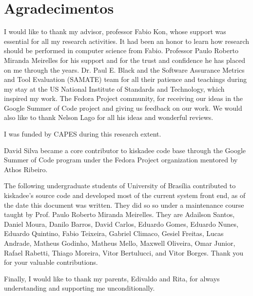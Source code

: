 \chapter*{Agradecimentos}

I would like to thank my advisor, professor Fabio Kon, whose support was
essential for all my research activities. It had been an honor to learn how
research should be performed in computer science from Fabio.  Professor Paulo
Roberto Miranda Meirelles for his support and for the trust and confidence he
has placed on me through the years. Dr. Paul E. Black and the Software
Assurance Metrics and Tool Evaluation (SAMATE) team for all their patience and
teachings during my stay at the US National Institute of Standards and
Technology, which inspired my work. The Fedora Project community, for receiving
our ideas in the Google Summer of Code project and giving us feedback on our
work. We would also like to thank Nelson Lago for all his ideas and wonderful
reviews.

I was funded by CAPES during this research extent.

David Silva became a core contributor to kiskadee code base through the Google
Summer of Code program under the Fedora Project organization mentored by Athos
Ribeiro.

The following undergraduate students of University of Brasília contributed to
kiskadee's source code and developed most of the current system front end, as of
the date this document was written. They did so so under a maintenance course
taught by Prof. Paulo Roberto Miranda Meirelles.
They are Adailson Santos,
Daniel Moura,
Danilo Barros,
David Carlos,
Eduardo Gomes,
Eduardo Nunes,
Eduardo Quintino,
Fabio Teixeira,
Gabriel Climaco,
Gesiel Freitas,
Lucas Andrade,
Matheus Godinho,
Matheus Mello,
Maxwell Oliveira,
Omar Junior,
Rafael Rabetti,
Thiago Moreira,
Vitor Bertulucci, and
Vitor Borges.
Thank you for your valuable contributions.

Finally, I would like to thank my parents, Edivaldo and Rita, for always
understanding and supporting me unconditionally.

